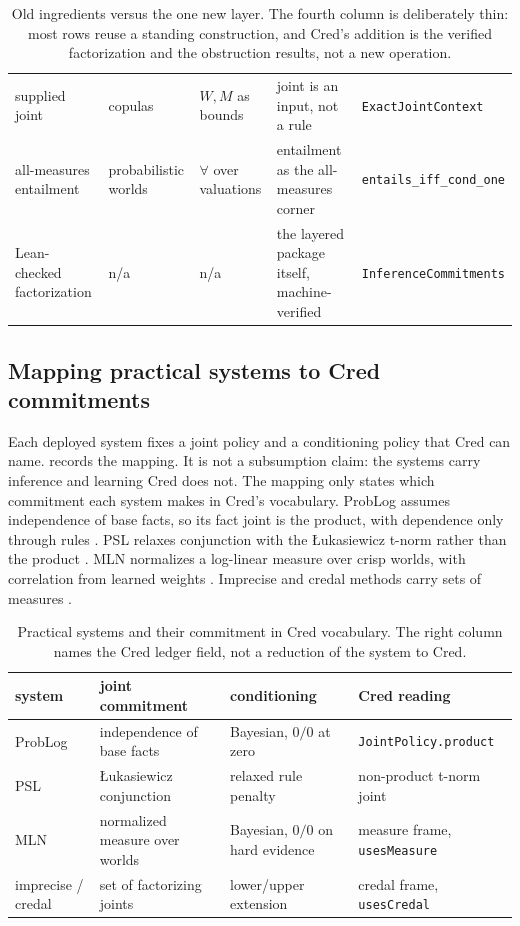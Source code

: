\documentclass[11pt,a4paper]{article}
\newcommand{\Lean}[1]{\texttt{#1}}
\begin{document}
\begin{table}[h]
{\begin{tabular}{@{}p{2.2cm}p{2.9cm}p{2.4cm}p{4.2cm}p{2.9cm}@{}}
supplied joint & copulas \cite{sklar1959} & $W,M$ as bounds & joint is an input, not a rule & \Lean{ExactJoint}\allowbreak\Lean{Context} \\
all-measures entailment & probabilistic worlds \cite{pearl1988} & $\forall$ over valuations & entailment as the all-measures corner & \Lean{entails\_iff\_}\allowbreak\Lean{cond\_one} \\
Lean-checked factorization & n/a & n/a & the layered package itself, machine-verified & \Lean{Inference}\allowbreak\Lean{Commitments} \\
\bottomrule
\end{tabular}%
}
\caption{Old ingredients versus the one new layer.  The fourth column is
deliberately thin: most rows reuse a standing construction, and Cred's
addition is the verified factorization and the obstruction results, not
a new operation.}
\label{tab:old-vs-new}
\end{table}

\subsection{Mapping practical systems to Cred commitments}
\label{sec:system-mapping}

Each deployed system fixes a joint policy and a conditioning policy that
Cred can name.   records the mapping.  It is not
a subsumption claim: the systems carry inference and learning Cred does
not.  The mapping only states which commitment each system makes in
Cred's vocabulary.  ProbLog assumes independence of base facts, so its
fact joint is the product, with dependence only through rules
\cite{sato1995,deraedt2007,fierens2015}.  PSL relaxes conjunction with
the \L ukasiewicz t-norm rather than the product \cite{bach2017,kimmig2012}.
MLN normalizes a log-linear measure over crisp worlds, with correlation
from learned weights \cite{richardson2006}.  Imprecise and credal
methods carry sets of measures \cite{walley1991,cozman2000,maua2020}.

\begin{table}[h]
\centering
\footnotesize
\begin{tabular}{@{}p{2.3cm}p{3.7cm}p{2.6cm}p{3.6cm}@{}}
\toprule
system & joint commitment & conditioning & Cred reading \\
\midrule
ProbLog & independence of base facts & Bayesian, $0/0$ at zero & \Lean{JointPolicy.product} \\
PSL & \L ukasiewicz conjunction & relaxed rule penalty & non-product t-norm joint \\
MLN & normalized measure over worlds & Bayesian, $0/0$ on hard evidence & measure frame, \Lean{usesMeasure} \\
imprecise / credal & set of factorizing joints & lower/upper extension & credal frame, \Lean{usesCredal} \\
\bottomrule
\end{tabular}
\caption{Practical systems and their commitment in Cred vocabulary.  The
right column names the Cred ledger field, not a reduction of the system
to Cred.}
\label{tab:system-mapping}
\end{table}
\end{document}
